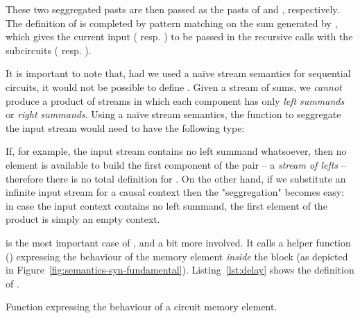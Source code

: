             These two seggregated pasts are then passed as the pasts of  and , respectively.
            The definition of  is completed by pattern matching on the sum generated
            by  \AY{\{}\AY{\}} , which gives the current input
            ( resp. ) to be passed in the recursive calls with the subcircuits
            (   resp.   ).

            It is important to note that, had we used a naïve stream semantics for sequential circuits,
            it would not be possible to define .
            Given a stream of sums, we \emph{cannot} produce a product of streams in which each component
            has only \emph{left summands} or \emph{right summands}.
            Using a naïve stream semantics, the function to seggregate the input stream would need to have
            the following type:

            \begin{center}
            \end{center}

            If, for example, the input stream contains no left summand whatsoever, then
            no element is available to build the first component of the
            pair – a \emph{stream of lefts} – therefore there is no total definition for .
            On the other hand, if we substitute an infinite input stream for a causal context then
            the "seggregation" becomes easy: in case the input context
            contains no left summand, the first element of the product is simply an empty context.


             is the most important case of , and a bit more involved.
            It calls a helper function ()
            expressing the behaviour of the memory element \emph{inside} the  block
            (as depicted in Figure~\ref{fig:semantics-syn-fundamental}).
            Listing~\ref{lst:delay} shows the definition of .

            \begin{listing}[h]
                \caption{Function expressing the behaviour of a circuit memory element.\label{lst:delay}}
            \end{listing}

